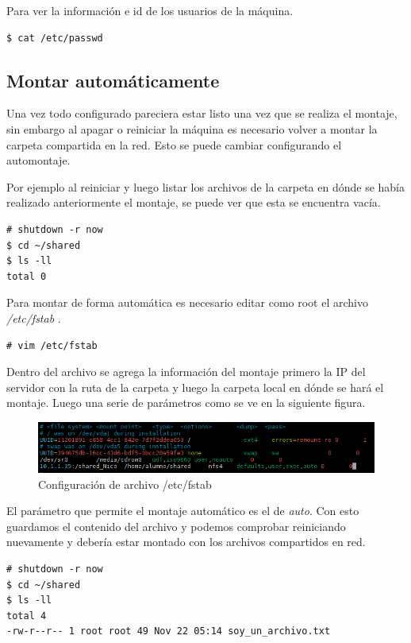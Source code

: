 \documentclass[12pt]{article}
\begin{document}
Para ver la información e id de los usuarios de la máquina.
\begin{lstlisting}[frame=single]
$ cat /etc/passwd
\end{lstlisting}
\subsection{Montar automáticamente}

Una vez todo configurado pareciera estar listo una vez que se realiza el montaje, sin embargo al apagar o reiniciar la máquina es necesario volver a montar la carpeta compartida en la red. Esto se puede cambiar configurando el automontaje.


Por ejemplo al reiniciar y luego listar los archivos de la carpeta en dónde se había realizado anteriormente el montaje, se puede ver que esta se encuentra vacía.
\begin{lstlisting}[frame=single]
# shutdown -r now
$ cd ~/shared
$ ls -ll
total 0
\end{lstlisting}
\newpage
Para montar de forma automática es necesario editar como root el archivo \emph{/etc/fstab} .
\begin{lstlisting}[frame=single]
# vim /etc/fstab
\end{lstlisting}

Dentro del archivo se agrega la información del montaje primero la IP del servidor con la ruta de la carpeta y luego la carpeta local en dónde se hará el montaje. Luego una serie de parámetros como se ve en la siguiente figura. 

\begin{figure}[!h]
   \centering
   \includegraphics[scale=.85]{imgs/nfs_auto.PNG}
   \caption{Configuración de archivo /etc/fstab}
   \label{fig10}
\end{figure}

El parámetro que permite el montaje automático es el de \emph{auto}. Con esto guardamos el contenido del archivo y podemos comprobar reiniciando nuevamente y debería estar montado con los archivos compartidos en red.

\begin{lstlisting}[frame=single]
# shutdown -r now
$ cd ~/shared
$ ls -ll
total 4
-rw-r--r-- 1 root root 49 Nov 22 05:14 soy_un_archivo.txt
\end{lstlisting}
\end{document}
